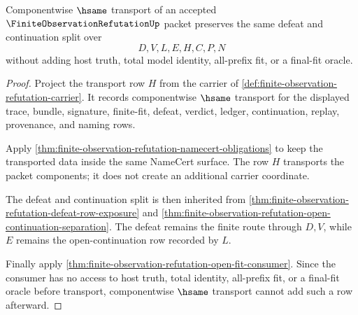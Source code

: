 \begin{theorem}
\label{thm:finite-observation-refutation-scoped-carrier-transport}
Componentwise $\hsame$ transport of an accepted $\FiniteObservationRefutationUp$ packet preserves the same defeat and continuation split over
$$
D,V,L,E,H,C,P,N
$$
without adding host truth, total model identity, all-prefix fit, or a final-fit oracle.
\end{theorem}
\begin{proof}
Project the transport row $H$ from the carrier of \autoref{def:finite-observation-refutation-carrier}. It records componentwise $\hsame$ transport for the displayed trace, bundle, signature, finite-fit, defeat, verdict, ledger, continuation, replay, provenance, and naming rows.

Apply \autoref{thm:finite-observation-refutation-namecert-obligations} to keep the transported data inside the same NameCert surface. The row $H$ transports the packet components; it does not create an additional carrier coordinate.

The defeat and continuation split is then inherited from \autoref{thm:finite-observation-refutation-defeat-row-exposure} and \autoref{thm:finite-observation-refutation-open-continuation-separation}. The defeat remains the finite route through $D,V$, while $E$ remains the open-continuation row recorded by $L$.

Finally apply \autoref{thm:finite-observation-refutation-open-fit-consumer}. Since the consumer has no access to host truth, total identity, all-prefix fit, or a final-fit oracle before transport, componentwise $\hsame$ transport cannot add such a row afterward.
\end{proof}

